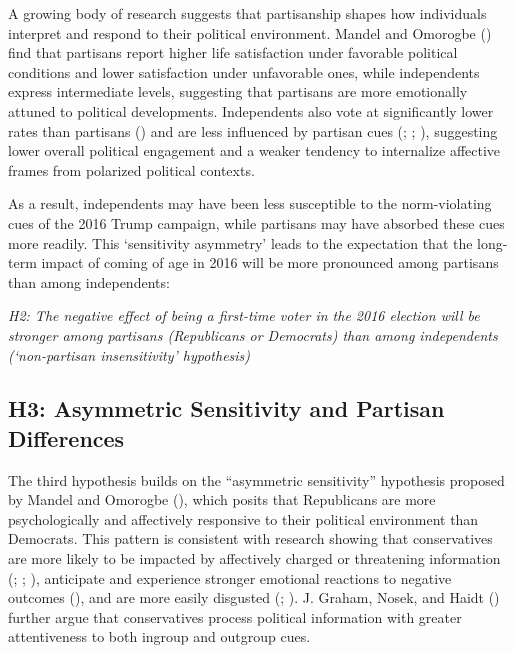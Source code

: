 \documentclass[
  10pt,
  letterpaper,
  DIV=11,
  numbers=noendperiod]{scrartcl}
\begin{document}
A growing body of research suggests that partisanship shapes how
individuals interpret and respond to their political environment. Mandel
and Omorogbe () find that partisans
report higher life satisfaction under favorable political conditions and
lower satisfaction under unfavorable ones, while independents express
intermediate levels, suggesting that partisans are more emotionally
attuned to political developments. Independents also vote at
significantly lower rates than partisans
() and are
less influenced by partisan cues (; ;
), suggesting
lower overall political engagement and a weaker tendency to internalize
affective frames from polarized political contexts.

As a result, independents may have been less susceptible to the
norm-violating cues of the 2016 Trump campaign, while partisans may have
absorbed these cues more readily. This `sensitivity asymmetry' leads to
the expectation that the long-term impact of coming of age in 2016 will
be more pronounced among partisans than among independents:

\emph{H2: The negative effect of being a first-time voter in the 2016
election will be stronger among partisans (Republicans or Democrats)
than among independents (`non-partisan insensitivity' hypothesis)}

\subsection{H3: Asymmetric Sensitivity and Partisan
Differences}\label{h3-asymmetric-sensitivity-and-partisan-differences}

The third hypothesis builds on the ``asymmetric sensitivity'' hypothesis
proposed by Mandel and Omorogbe (), which
posits that Republicans are more psychologically and affectively
responsive to their political environment than Democrats. This pattern
is consistent with research showing that conservatives are more likely
to be impacted by affectively charged or threatening information
(;
;
), anticipate and experience
stronger emotional reactions to negative outcomes
(), and are more
easily disgusted (;
). J. Graham, Nosek, and
Haidt () further argue that conservatives
process political information with greater attentiveness to both ingroup
and outgroup cues.
\end{document}
